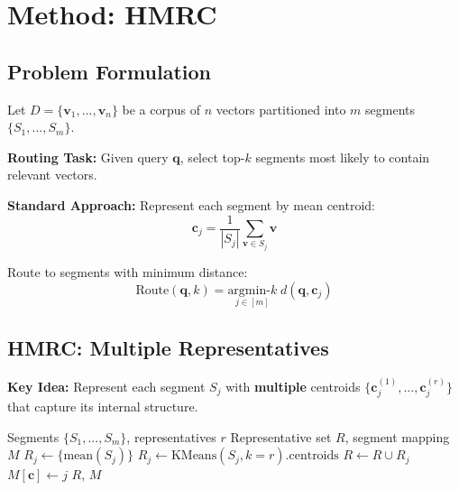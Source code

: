 \documentclass[sigconf, nonacm]{acmart}
\begin{document}

\section{Method: HMRC}
\label{sec:method}

\subsection{Problem Formulation}

Let $D = \{\mathbf{v}_1, ..., \mathbf{v}_n\}$ be a corpus of $n$ vectors partitioned into $m$ segments $\{S_1, ..., S_m\}$.

\textbf{Routing Task:} Given query $\mathbf{q}$, select top-$k$ segments most likely to contain relevant vectors.

\textbf{Standard Approach:} Represent each segment by mean centroid:
\begin{equation}
\mathbf{c}_j = \frac{1}{|S_j|} \sum_{\mathbf{v} \in S_j} \mathbf{v}
\end{equation}

Route to segments with minimum distance:
\begin{equation}
\text{Route}(\mathbf{q}, k) = \underset{j \in [m]}{\text{argmin-}k} \; d(\mathbf{q}, \mathbf{c}_j)
\end{equation}

\subsection{HMRC: Multiple Representatives}

\textbf{Key Idea:} Represent each segment $S_j$ with \textbf{multiple} centroids $\{\mathbf{c}_j^{(1)}, ..., \mathbf{c}_j^{(r)}\}$ that capture its internal structure.

\begin{algorithm}[h]
\caption{HMRC Index Construction}
\label{alg:build}
\begin{algorithmic}[1]
\REQUIRE Segments $\{S_1, ..., S_m\}$, representatives $r$
\ENSURE Representative set $R$, segment mapping $M$
        \STATE $R_j \leftarrow \{\text{mean}(S_j)\}$ 
    \ELSE
        \STATE $R_j \leftarrow \text{KMeans}(S_j, k=r).\text{centroids}$
    \ENDIF
    \STATE $R \leftarrow R \cup R_j$
        \STATE $M[\mathbf{c}] \leftarrow j$ 
    \ENDFOR
\ENDFOR
\RETURN $R$, $M$
\end{algorithmic}
\end{algorithm}
\end{document}
